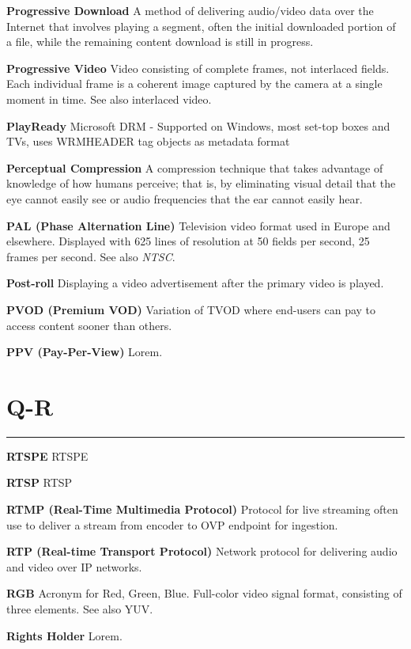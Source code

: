 \smallskip
\textbf{Progressive Download}
A method of delivering audio/video data over the Internet that involves playing a segment, often the initial downloaded portion of a file, while the remaining content download is still in progress.

\smallskip
\textbf{Progressive Video}
Video consisting of complete frames, not interlaced fields. Each individual frame is a coherent image captured by the camera at a single moment in time. See also interlaced video.

\smallskip
\textbf{PlayReady}
Microsoft DRM - Supported on Windows, most set-top boxes and TVs, uses WRMHEADER tag objects as metadata format

\smallskip
\textbf{Perceptual Compression}
A compression technique that takes advantage of knowledge of how humans perceive; that is, by eliminating visual detail that the eye cannot easily see or audio frequencies that the ear cannot easily hear.

\smallskip
\textbf{PAL (Phase Alternation Line)}
Television video format used in Europe and elsewhere. Displayed with 625 lines of resolution at 50 fields per second, 25 frames per second. See also \textit{NTSC}.

\smallskip
\textbf{Post-roll}
Displaying a video advertisement after the primary video is played.

\smallskip
\textbf{PVOD (Premium VOD)}
Variation of TVOD where end-users can pay to access content sooner than others.

\smallskip
\textbf{PPV (Pay-Per-View)}
Lorem.


\section{Q-R}
\hrule

\medskip
\textbf{RTSPE}
RTSPE

\smallskip
\textbf{RTSP}
RTSP

\smallskip
\textbf{RTMP (Real-Time Multimedia Protocol)}
Protocol for live streaming often use to deliver a stream from encoder to OVP endpoint for ingestion.

\smallskip
\textbf{RTP (Real-time Transport Protocol)}
Network protocol for delivering audio and video over IP networks.

\smallskip
\textbf{RGB}
Acronym for Red, Green, Blue. Full-color video signal format, consisting of three elements. See also YUV.

\smallskip
\textbf{Rights Holder}
Lorem.

